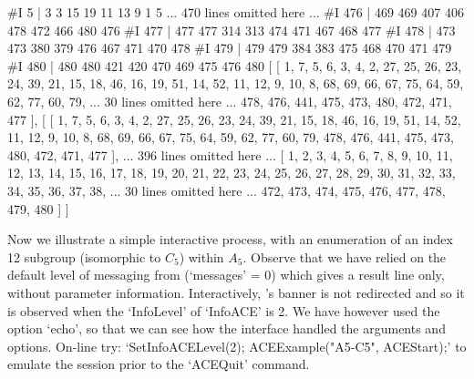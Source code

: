 #I       5 |      3      3     15     19     11     13      9      1      5
... 470 lines omitted here ...
#I     476 |    469    469    407    406    478    472    466    480    476
#I     477 |    477    477    314    313    474    471    467    468    477
#I     478 |    473    473    380    379    476    467    471    470    478
#I     479 |    479    479    384    383    475    468    470    471    479
#I     480 |    480    480    421    420    470    469    475    476    480
[ [ 1, 7, 5, 6, 3, 4, 2, 27, 25, 26, 23, 24, 39, 21, 15, 18, 46, 16, 19, 51, 
      14, 52, 11, 12, 9, 10, 8, 68, 69, 66, 67, 75, 64, 59, 62, 77, 60, 79, 
... 30 lines omitted here ...
      478, 476, 441, 475, 473, 480, 472, 471, 477 ],
[ [ 1, 7, 5, 6, 3, 4, 2, 27, 25, 26, 23, 24, 39, 21, 15, 18, 46, 16, 19, 51, 
      14, 52, 11, 12, 9, 10, 8, 68, 69, 66, 67, 75, 64, 59, 62, 77, 60, 79, 
      478, 476, 441, 475, 473, 480, 472, 471, 477 ], 
... 396 lines omitted here ...
  [ 1, 2, 3, 4, 5, 6, 7, 8, 9, 10, 11, 12, 13, 14, 15, 16, 17, 18, 19, 20, 
      21, 22, 23, 24, 25, 26, 27, 28, 29, 30, 31, 32, 33, 34, 35, 36, 37, 38, 
... 30 lines omitted here ...
      472, 473, 474, 475, 476, 477, 478, 479, 480 ] ]
\endexample


Now we illustrate a simple interactive process, with an enumeration of
an index 12 subgroup (isomorphic to $C_5$) within $A_5$. Observe  that
we  have  relied  on  the  default  level  of  messaging  from  {\ACE}
(`messages' = 0) which gives a result  line  only,  without  parameter
information. Interactively, {\ACE}'s banner is not redirected  and  so
it is observed when the `InfoLevel' of `InfoACE' is 2. We have however
used the option `echo', so that we can see how the  interface  handled
the  arguments  and   options.   On-line   try:   `SetInfoACELevel(2);
ACEExample("A5-C5", ACEStart);' to emulate the session  prior  to  the
`ACEQuit' command.

